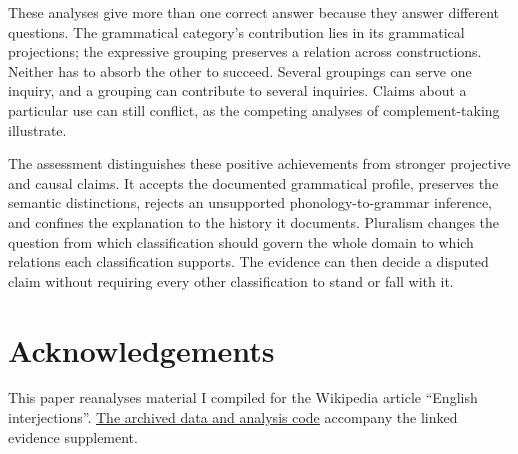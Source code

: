 \documentclass[12pt]{article}
\newif\ifblind
\begin{document}
These analyses give more than one correct answer because they answer
different questions. The grammatical category's contribution lies in
its grammatical projections; the expressive grouping preserves a relation
across constructions. Neither has to absorb the other to succeed.
Several groupings can serve one inquiry, and a grouping can contribute
to several inquiries. Claims about a particular use can still conflict,
as the competing analyses of complement-taking  illustrate.

The assessment distinguishes these positive achievements from stronger
projective and causal claims. It accepts the documented grammatical
profile, preserves the semantic distinctions, rejects an unsupported
phonology-to-grammar inference, and confines the  explanation
to the history it documents. Pluralism changes the question from
which classification should govern the whole domain to which relations
each classification supports. The evidence can then decide a disputed
claim without requiring every other classification to stand or fall
with it.

\ifblind\else
\section*{Acknowledgements}

This paper reanalyses material I compiled for the Wikipedia article
\enquote{English interjections}.
\href{https://github.com/BrettRey/interjections-hpc/tree/master}{The archived
data and analysis code} accompany the linked evidence supplement.
\fi

\clearpage
\begingroup
\setlength{\emergencystretch}{3em}
\printbibliography
\endgroup
\end{document}
